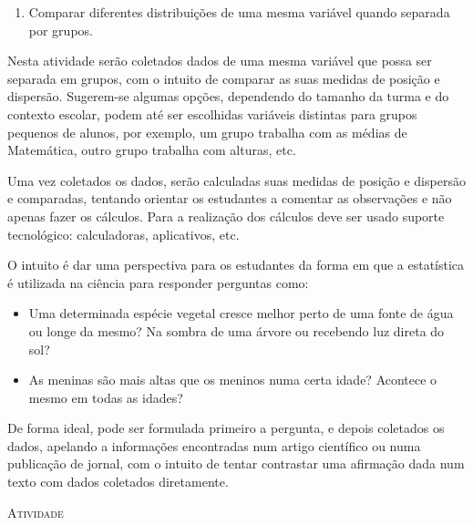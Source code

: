 \begin{goals}
\begin{enumerate}
\item Comparar diferentes distribuições de uma mesma variável quando separada por grupos.
\end{enumerate}

\tcblower

Nesta atividade serão coletados dados de uma mesma variável que possa ser separada em grupos, com o intuito de comparar as suas medidas de posição e dispersão. Sugerem-se algumas opções, dependendo do tamanho da turma e do contexto escolar, podem até ser escolhidas variáveis distintas para grupos pequenos de alunos, por exemplo, um grupo trabalha com as médias de Matemática, outro grupo trabalha com alturas, etc.

Uma vez coletados os dados, serão calculadas suas medidas de posição e dispersão e comparadas, tentando orientar os estudantes a comentar as observações e não apenas fazer os cálculos. Para a realização dos cálculos deve ser usado suporte tecnológico: calculadoras, aplicativos, etc.

O intuito é dar uma perspectiva para os estudantes da forma em que a estatística é utilizada na ciência para responder perguntas como:

\begin{itemize}
\item Uma determinada espécie vegetal cresce melhor perto de uma fonte de água ou longe da mesmo? Na sombra de uma árvore ou recebendo luz direta do sol?
\item As meninas são mais altas que os meninos numa certa idade? Acontece o mesmo em todas as idades?
\end{itemize}

De forma ideal, pode ser formulada primeiro a pergunta, e depois coletados os dados, apelando a informações encontradas num artigo científico ou numa publicação de jornal, com o intuito de tentar contrastar uma afirmação dada num texto com dados coletados diretamente.
\end{goals}

\bigskip
\begin{center}
{\large \scshape Atividade}
\end{center}
\fi

